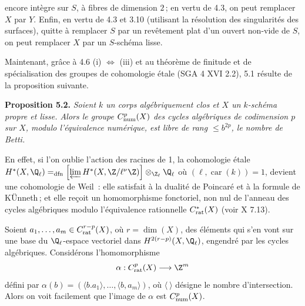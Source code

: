 
encore int\`egre sur \(S\), \`a fibres de dimension \(2\)\,; en vertu de 4.3, on peut remplacer \(X\) par \(Y\). Enfin, en vertu de 4.3 et 3.10 (utilisant la r\'esolution des singularit\'es des surfaces), quitte \`a remplacer \(S\) par un rev\^etement plat d'un ouvert non-vide de \(S\), on peut remplacer \(X\) par un \(S\)-sch\'ema lisse.

Maintenant, gr\^ace \`a 4.6 (i) \(\Longleftrightarrow\) (iii) et au th\'eor\`eme de finitude et de sp\'ecialisation des groupes de cohomologie \'etale (SGA 4 XVI 2.2), 5.1 r\'esulte de la proposition suivante.

\textbf{Proposition 5.2.} \emph{Soient \(k\) un corps alg\'ebriquement clos et \(X\) un \(k\)-sch\'ema propre et lisse. Alors le groupe \(C^p_{\rm num}(X)\) des cycles alg\'ebriques de codimension \(p\) sur \(X\), modulo l'\'equivalence num\'erique, est libre de rang \(\le b^{2p}\), le nombre de Betti.}

En effet, si l'on oublie l'action des racines de 1, la cohomologie \'etale \(H^*(X,\Q_\ell)=_{\rm dfn}\left[\varprojlim H^*(X,\Z/\ell^\nu\Z)\right]\otimes_{\Z_\ell}\Q_\ell\) o\`u \((\ell,\operatorname{car}(k))=1\), devient une cohomologie de Weil~: elle satisfait \`a la dualit\'e de Poincar\'e et \`a la formule de K\"Unneth\,; et elle re\c{c}oit un homomorphisme fonctoriel, non nul de l'anneau des cycles alg\'ebriques modulo l'\'equivalence rationnelle \(C^*_{\rm rat}(X)\) (voir X 7.13).

Soient \(a_1,\ldots,a_m\in C^{r-p}_{\rm rat}(X)\), o\`u \(r=\dim(X)\), des \'el\'ements qui s'en vont sur une base du \(\Q_\ell\)-espace vectoriel dans \(H^{2(r-p)}(X,\Q_\ell)\), engendr\'e par les cycles alg\'ebriques. Consid\'erons l'homomorphisme
\[
   \alpha:C^p_{\rm rat}(X)\longrightarrow \Z^m
\]
d\'efini par \(\alpha(b)=(\langle b.a_1\rangle,\ldots,\langle b,a_m\rangle)\), o\`u \(\langle\ \rangle\) d\'esigne le nombre d'intersection. Alors on voit facilement que l'image de \(\alpha\) est \(C^p_{\rm num}(X)\).

